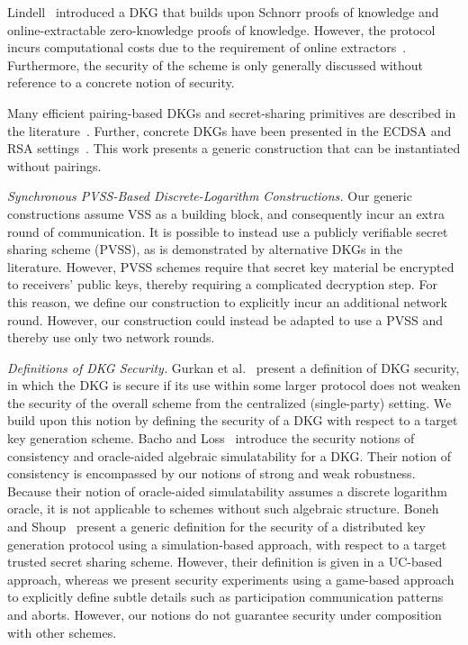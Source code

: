 Lindell~\cite{Lindell22} introduced a DKG that builds
upon Schnorr proofs of knowledge and online-extractable zero-knowledge proofs of knowledge.
However, the protocol incurs computational costs due to the
requirement of online extractors~\cite{Fischlin05}.
Furthermore, the security of the scheme is only generally discussed without reference to a concrete notion of security.


Many efficient pairing-based DKGs and secret-sharing primitives are described in the
literature~\cite{GurkanJMMST21,Groth21,AbrahamJMMS2022,ZhangXHSZ22}.
Further, concrete DKGs have been presented in the ECDSA and RSA
settings~\cite{LindellN18,DamgardM10,FrankelMY98,CanettiGGMP20}.
This work presents a generic construction that can be instantiated
without pairings.


\medskip

\noindent\textit{Synchronous PVSS-Based Discrete-Logarithm Constructions.}
Our generic constructions assume VSS as a building block,
and consequently incur an extra round of communication.
It is possible to instead use a publicly verifiable secret sharing scheme (PVSS),
as is demonstrated by alternative DKGs in the literature.
However,
PVSS schemes require that secret key material be encrypted to receivers' public keys,
thereby requiring a complicated decryption step.
For this reason,
we define our construction to explicitly incur an additional network round.
However, our construction could instead be adapted to use a PVSS and thereby
use only two network rounds.


\medskip

\noindent\textit{Definitions of DKG Security.}
Gurkan et al.~\cite{GurkanJMMST21} present a definition of DKG security, in which the DKG is secure if its use within some larger protocol
does not weaken the security of the overall scheme from the centralized (single-party) setting.
We build upon this notion by defining the security of a DKG with respect to a target key generation scheme.
%
Bacho and Loss~\cite{BachoL22}
introduce the security notions of consistency and oracle-aided algebraic
simulatability for a DKG.
Their notion of consistency is encompassed by our notions of strong and weak robustness.
Because their notion of oracle-aided simulatability assumes a discrete logarithm oracle, it is not applicable to schemes without such algebraic structure.
Boneh and Shoup~\cite{BonehS2020} present a generic definition for the security
of a distributed key generation protocol using a simulation-based approach,
with respect to a target trusted secret sharing scheme.
However, their definition is given in a UC-based approach,
whereas we present security experiments using a game-based approach to
explicitly define subtle details such as participation communication patterns and aborts.
However, our notions do not guarantee security under composition with other schemes.
